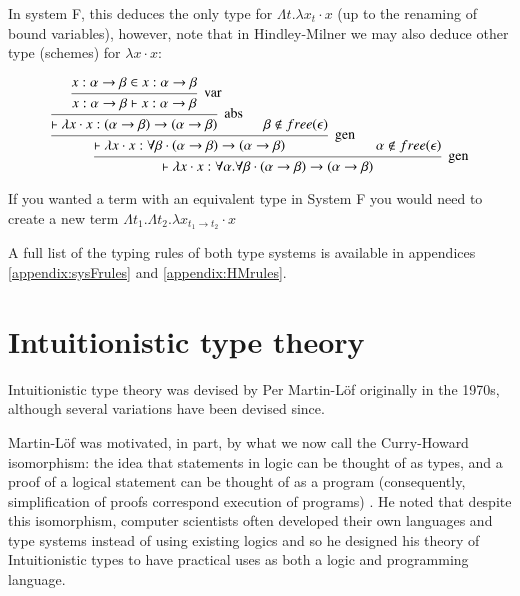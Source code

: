             In system F, this deduces the only type for $\Lambda t . \lambda x_t
            \cdot x$ (up to the renaming of bound variables), however, note that
            in Hindley-Milner we may also deduce other type (schemes)
            for $\lambda x \cdot x$: 
            
            \[\begin{array}{c}
            \mbox{\begin{prooftree}
                        \hypo{x : \alpha \to \beta \in x : \alpha \to \beta}
                    \infer1[var]{x : \alpha \to \beta \vdash x : \alpha \to \beta}   
                    \infer1[abs]{\vdash \lambda x \cdot x : (\alpha \to \beta) \to
                    (\alpha \to \beta)}
                    \hypo{\beta \notin free(\epsilon)}        
                \infer2[gen]{\vdash \lambda x \cdot x : \forall \beta \cdot
                  (\alpha \to \beta) \to (\alpha \to \beta)}
                \hypo{\alpha \notin free(\epsilon)}
               \infer2[gen]{\vdash \lambda x \cdot x : \forall \alpha . \forall
                 \beta \cdot (\alpha \to \beta) \to (\alpha \to \beta)}
            \end{prooftree}}
            \end{array} \]
                                   
            If you wanted a term with an equivalent type in System F you would
            need to create a new term $\Lambda t_1 . \Lambda t_2 . \lambda x_{t_1
              \to t_2} \cdot x$
            
            A full list of the typing rules of both type systems is available in
            appendices \ref{appendix:sysFrules} and
            \ref{appendix:HMrules}. 
                    
          \section{Intuitionistic type theory}
        
          Intuitionistic type theory was devised by Per Martin-Löf
          \cite{martinlof1980} originally in the 1970s, although
          several variations have been devised since.

          Martin-Löf was motivated, in part, by what we now call the
          Curry-Howard isomorphism: the idea that statements in logic can be
          thought of as types, and a proof of a logical statement can
          be thought of as a program (consequently, simplification of
          proofs correspond execution of programs)
          \cite{wadler2015}. He noted that despite this isomorphism,
          computer scientists often developed their own
          languages and type systems instead of using existing
          logics and so he designed his theory of Intuitionistic types
          to have practical uses as both a logic and programming language.

